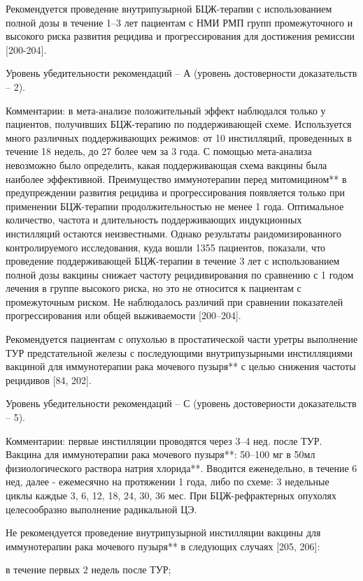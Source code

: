 Рекомендуется проведение внутрипузырной БЦЖ-терапии с использованием полной дозы в течение 1–3 лет пациентам с НМИ РМП групп промежуточного и высокого риска развития рецидива и прогрессирования для достижения ремиссии [200-204].

Уровень убедительности рекомендаций – А (уровень достоверности доказательств – 2).

Комментарии: в мета-анализе положительный эффект наблюдался только у пациентов, получивших БЦЖ-терапию по поддерживающей схеме. Используется много различных поддерживающих режимов: от 10 инстилляций, проведенных в течение 18 недель, до 27 более чем за 3 года. С помощью мета-анализа невозможно было определить, какая поддерживающая схема вакцины была наиболее эффективной. Преимущество иммунотерапии перед митомицином** в предупреждении развития рецидива и прогрессирования появляется только при применении БЦЖ-терапии продолжительностью не менее 1 года. Оптимальное количество, частота и длительность поддерживающих индукционных инстилляций остаются неизвестными. Однако результаты рандомизированного контролируемого исследования, куда вошли 1355 пациентов, показали, что проведение поддерживающей БЦЖ-терапии в течение 3 лет с использованием полной дозы вакцины снижает частоту рецидивирования по сравнению с 1 годом лечения в группе высокого риска, но это не относится к пациентам с промежуточным риском. Не наблюдалось различий при сравнении показателей прогрессирования или общей выживаемости [200–204].  

Рекомендуется пациентам с опухолью в простатической части уретры выполнение ТУР предстательной железы с последующими внутрипузырными инстилляциями вакциной для иммунотерапии рака мочевого пузыря** с целью снижения частоты рецидивов [84, 202].

Уровень убедительности рекомендаций – С (уровень достоверности доказательств – 5).

Комментарии: первые инстилляции проводятся через 3–4 нед. после ТУР. Вакцина для иммунотерапии рака мочевого пузыря**: 50–100 мг в 50мл физиологического раствора натрия хлорида**. Вводится еженедельно, в течение 6 нед, далее - ежемесячно на протяжении 1 года, либо по схеме: 3 недельные циклы каждые 3, 6, 12, 18, 24, 30, 36 мес. При БЦЖ-рефрактерных опухолях целесообразно выполнение радикальной ЦЭ.

Не рекомендуется проведение внутрипузырной инстилляции вакцины для иммунотерапии рака мочевого пузыря** в следующих случаях [205, 206]: 

в течение первых 2 недель после ТУР; 

